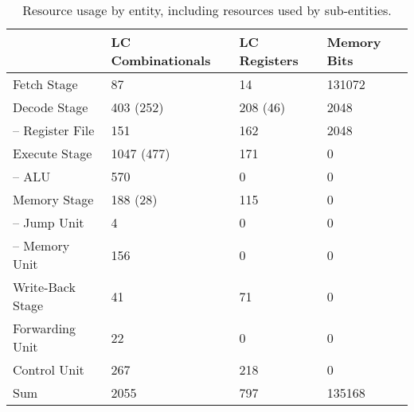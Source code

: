 \begin{table}[htb]
  \centering
  \caption{Resource usage by entity, including resources used by sub-entities.}
  \begin{tabular}{llll}
    \toprule
                         & LC Combinationals & LC Registers & Memory Bits \\
    \midrule
    Fetch Stage          & 87                & 14           & 131072 \\
    Decode Stage         & 403 (252)         & 208 (46)     & 2048 \\
    -- Register File     & 151               & 162          & 2048 \\
    Execute Stage        & 1047 (477)        & 171          & 0 \\
    -- ALU               & 570               & 0            & 0 \\
    Memory Stage         & 188 (28)          & 115          & 0 \\
    -- Jump Unit         & 4                 & 0            & 0 \\
    -- Memory Unit       & 156               & 0            & 0 \\
    Write-Back Stage     & 41                & 71           & 0 \\
    Forwarding Unit      & 22                & 0            & 0 \\
    Control Unit         & 267               & 218          & 0 \\
    \cmidrule{1-4}
    Sum                  & 2055              & 797          & 135168 \\
    \bottomrule
  \end{tabular}
\end{table}

\begin{qa}
  \answer{}
\end{qa}
